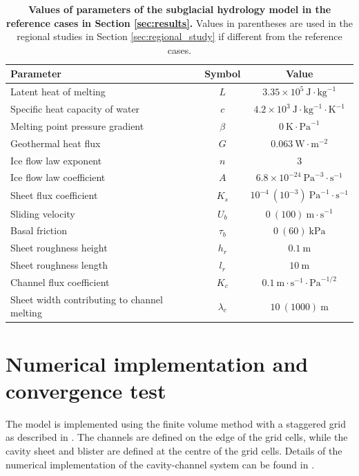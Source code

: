 \documentclass[draft]{agujournal2019}
\newcommand{\secref}[1]{Section \ref{#1}}
\begin{document}
\begin{table}[htbp]
    \centering
    \caption{\textbf{Values of parameters of the subglacial hydrology model in the reference cases in \secref{sec:results}.} Values in parentheses are used in the regional studies in \secref{sec:regional_study} if different from the reference cases.}
    \begin{tabular}{lcc}
        \hline
        Parameter & Symbol & Value \\   
        \hline
        Latent heat of melting & $L$ & $3.35\times10^{5}~\text{J}\cdot\text{kg}^{-1}$ \\
        Specific heat capacity of water & $c$ & $4.2\times10^{3}~\text{J}\cdot\text{kg}^{-1}\cdot\text{K}^{-1}$ \\
        Melting point pressure gradient & $\beta$ & $0~\text{K}\cdot\text{Pa}^{-1}$ \\
        Geothermal heat flux & $G$ & $0.063~\text{W}\cdot\text{m}^{-2}$ \\
        Ice flow law exponent & $n$ & $3$ \\
        Ice flow law coefficient & $A$ & $6.8\times10^{-24}~\text{Pa}^{-3}\cdot\text{s}^{-1}$ \\
        Sheet flux coefficient & $K_s$ & $10^{-4}~(10^{-3})~\text{Pa}^{-1}\cdot\text{s}^{-1}$ \\
        Sliding velocity & $U_b$ & $0~(100)~\text{m}\cdot\text{s}^{-1}$ \\
        Basal friction & $\tau_b$ & $0~(60)~\text{kPa}$ \\
        Sheet roughness height & $h_r$ & $0.1~\text{m}$ \\
        Sheet roughness length & $l_r$ & $10~\text{m}$ \\
        Channel flux coefficient & $K_c$ & $0.1~\text{m}\cdot\text{s}^{-1}\cdot\text{Pa}^{-1/2}$ \\
        Sheet width contributing to channel melting & $\lambda_c$ & $10~(1000)~\text{m}$ \\
        \hline    
    \end{tabular}
    \label{tab:hydrology_parameters}
\end{table}

\section{Numerical implementation and convergence test}\label{apdx:convergence_test}
The model is implemented using the finite volume method with a staggered grid as described in . The channels are defined on the edge of the grid cells, while the cavity sheet and blister are defined at the centre of the grid cells. Details of the numerical implementation of the cavity-channel system can be found in .
\end{document}

